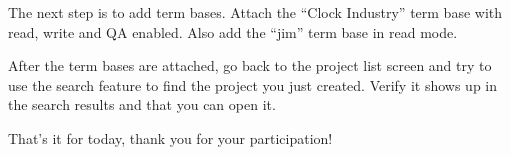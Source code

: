 The next step is to add term bases. 
Attach the “Clock Industry” term base with read, write and QA enabled. Also add the “jim” term base in read mode. 

After the term bases are attached, go back to the project list screen and try to use the search feature to find the project you just created. Verify it shows up in the search results and that you can open it. 

That's it for today, thank you for your participation! 